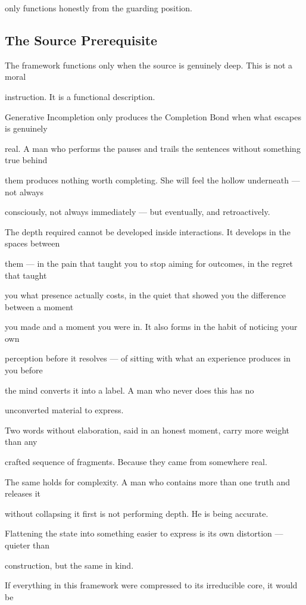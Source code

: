 \documentclass[12pt, a4paper]{article}
\begin{document}
only functions honestly from the guarding position.

\subsection{The Source Prerequisite}

The framework functions only when the source is genuinely deep. This is not a moral

instruction. It is a functional description.

Generative Incompletion only produces the Completion Bond when what escapes is genuinely

real. A man who performs the pauses and trails the sentences without something true behind

them produces nothing worth completing. She will feel the hollow underneath --- not always

consciously, not always immediately --- but eventually, and retroactively.

The depth required cannot be developed inside interactions. It develops in the spaces between

them --- in the pain that taught you to stop aiming for outcomes, in the regret that taught

you what presence actually costs, in the quiet that showed you the difference between a moment

you made and a moment you were in. It also forms in the habit of noticing your own

perception before it resolves --- of sitting with what an experience produces in you before

the mind converts it into a label. A man who never does this has no

unconverted material to express.

Two words without elaboration, said in an honest moment, carry more weight than any

crafted sequence of fragments. Because they came from somewhere real.

The same holds for complexity. A man who contains more than one truth and releases it

without collapsing it first is not performing depth. He is being accurate.

Flattening the state into something easier to express is its own distortion --- quieter than

construction, but the same in kind.

If everything in this framework were compressed to its irreducible core, it would be
\end{document}
